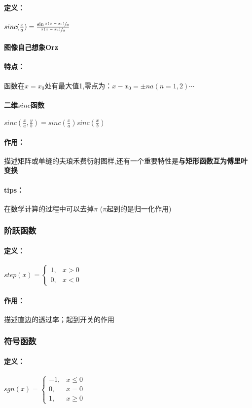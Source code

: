 \documentclass[UTF8]{ctexart}
\newcommand{\sinc}[1]{sinc(\f{x}{#1})}%
\newcommand{\sincc}[2]{sinc(\f{x}{#1},\f{y}{#2})}%
\newcommand{\f}[2]{\frac{#1}{#2}}%
\newcommand{\sfr}[2]{\sfrac{#1}{#2}}
\begin{document}
    \paragraph{定义：}$\sinc{a}=\f{\sin{\sfr{\pi(x-x_{0})}{a}}}{\sfr{\pi(x-x_{0})}{a}}$
    \paragraph{图像自己想象Orz}
    \paragraph{特点：}函数在$x=x_{0}$处有最大值1,零点为：$x-x_{0}=\pm na(n=1,2)\cdots$
    \paragraph{二维$sinc$函数}$\sincc{a}{b}=\sinc{a}\sinc{b}$
    \paragraph{作用：}
    描述矩阵或单缝的夫琅禾费衍射图样,还有一个重要特性是\textbf{与矩形函数互为傅里叶变换}
    \paragraph{tips：}在数学计算的过程中可以去掉$\pi$ ($\pi$起到的是归一化作用)
\subsubsection{阶跃函数}%
\paragraph{定义：}
$step(x) =
\begin{cases} 
1,  & x>0\\
0,  & x<0
\end{cases}%
$
\paragraph{作用：}描述直边的透过率；起到开关的作用
\subsubsection{符号函数}%
\paragraph{定义：}
$sgn(x)=
\begin{cases}
-1,  & x\le0\\
 0,  & x=0 \\
 1,  & x\ge0   
\end{cases}$
\end{document}
